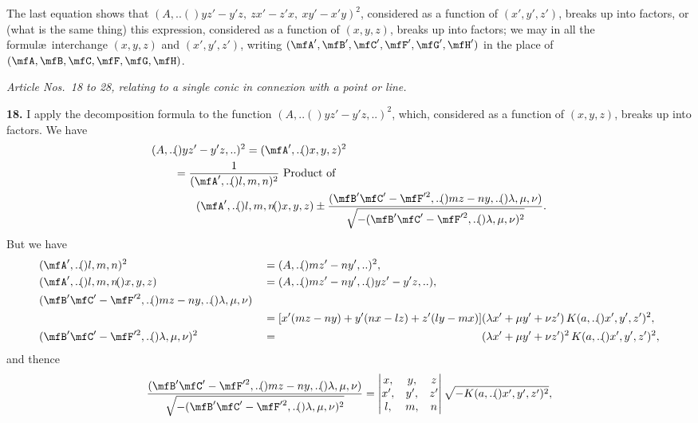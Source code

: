 \documentclass[11pt,a4paper]{book}
\providecommand{\qform}[1]{(#1)}
\begin{document}
The last equation shows that $(A,..\!\qform{}{yz' - y'z,\ zx' - z'x,\ xy' - x'y})^{2}$, considered as a function of $(x', y', z')$, breaks up into factors, or (what is the same thing) this expression, considered as a function of $(x, y, z)$, breaks up into factors; we may in all the formul\ae\ interchange $(x, y, z)$ and $(x', y', z')$, writing $(\mfA', \mfB', \mfC', \mfF', \mfG', \mfH')$ in the place of $(\mfA, \mfB, \mfC, \mfF, \mfG, \mfH)$.

\medskip
\begin{center}
\textit{Article Nos.\ 18 to 28, relating to a single conic in connexion with a point or line.}
\end{center}
\medskip

\textbf{18.} I apply the decomposition formula to the function $(A,..\!\qform{}{yz' - y'z,..})^{2}$, which, considered as a function of $(x, y, z)$, breaks up into factors. We have
\begin{align*}
&(A,..\!\qform{}{yz' - y'z,..})^{2} = (\mfA',..\!\qform{}{x, y, z})^{2}\\
&\qquad = \frac{1}{(\mfA',..\!\qform{}{l, m, n})^{2}} \text{ Product of}\\
&\qquad\qquad (\mfA',..\!\qform{}{l, m, n}\!\qform{}{x, y, z})
\pm \frac{(\mfB'\mfC' - \mfF'^{2},..\!\qform{}{mz - ny,..}\!\qform{}{\lambda, \mu, \nu})}
{\sqrt{- (\mfB'\mfC' - \mfF'^{2},..\!\qform{}{\lambda, \mu, \nu})^{2}}}.
\end{align*}
But we have
\begin{align*}
&(\mfA',..\!\qform{}{l, m, n})^{2} &&= (A,..\!\qform{}{mz' - ny',..})^{2},\\
&(\mfA',..\!\qform{}{l, m, n}\!\qform{}{x, y, z}) &&= (A,..\!\qform{}{mz' - ny',..}\!\qform{}{yz' - y'z,..}),\\
&(\mfB'\mfC' - \mfF'^{2},..\!\qform{}{mz - ny,..}\!\qform{}{\lambda, \mu, \nu})\\
&\qquad &&= [x'(mz - ny) + y'(nx - lz) + z'(ly - mx)](\lambda x' + \mu y' + \nu z')\, K(a,..\!\qform{}{x', y', z'})^{2},\\
&(\mfB'\mfC' - \mfF'^{2},..\!\qform{}{\lambda, \mu, \nu})^{2} &&= \phantom{[x'(mz - ny) + y'(nx - lz) + z'(ly - mx)]}
(\lambda x' + \mu y' + \nu z')^{2}\, K(a,..\!\qform{}{x', y', z'})^{2},
\end{align*}
and thence
\[
\frac{(\mfB'\mfC' - \mfF'^{2},..\!\qform{}{mz - ny,..}\!\qform{}{\lambda, \mu, \nu})}
{\sqrt{- (\mfB'\mfC' - \mfF'^{2},..\!\qform{}{\lambda, \mu, \nu})^{2}}}
=
\begin{vmatrix}
x, & y, & z \\
x', & y', & z' \\
l, & m, & n
\end{vmatrix}
\sqrt{- K(a,..\!\qform{}{x', y', z'})^{2}},
\]
\end{document}
